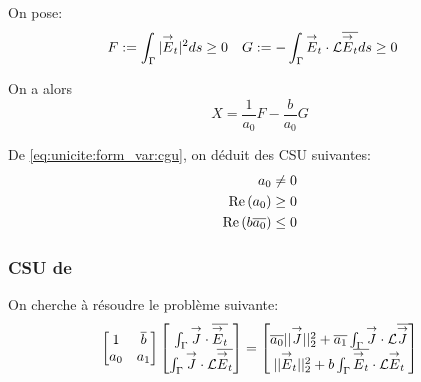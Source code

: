         On pose:
        \begin{align*}
          F&:= \int_\Gamma | {\overset{\rightarrow}{E}}_t | ^2 ds \ge 0 & G &:= -\int_\Gamma {\overset{\rightarrow}{E}}_t \cdot \mathcal{L}{\overline{{\overset{\rightarrow}{E}}_t}} ds \ge 0
        \end{align*}

        On a alors
        \begin{equation}
          \label{eq:unicite:form_var:decomp_cgu_ci1_a1_nul}
          X = \frac{1}{a_0}F - \frac{b}{a_0}G
        \end{equation}

        De \eqref{eq:unicite:form_var:cgu}, on déduit des CSU suivantes:
        \begin{align}
          a_0 \not= 0\\
          \operatorname{Re}\left(a_0\right) \ge 0\\
          \operatorname{Re}\left(b{\overline{a_0}}\right) \le 0
        \end{align}

    \subsubsection{CSU de \cite{stupfel_implementation_2015}}

      On cherche à résoudre le problème suivante:
      \[
        \begin{bmatrix}
          1 & {\overline{b}} \\
          a_0 & a_1
        \end{bmatrix}
        \begin{bmatrix}
          \int_\Gamma {\overset{\rightarrow}{J}} \cdot {\overline{{\overset{\rightarrow}{E}}_t}} \\
          \int_\Gamma {\overset{\rightarrow}{J}}\cdot \mathcal{L}{\overline{{\overset{\rightarrow}{E}}_t}}
        \end{bmatrix}
        =
        \begin{bmatrix}
          {\overline{a_0}}||{\overset{\rightarrow}{J}}||_2^2 + {\overline{a_1}}\int_\Gamma {\overset{\rightarrow}{J}} \cdot \mathcal{L}{\overline{{\overset{\rightarrow}{J}}}} \\
          ||{\overset{\rightarrow}{E}}_t||_2^2 + b\int_\Gamma {\overline{{\overset{\rightarrow}{E}}_t}} \cdot \mathcal{L}{\overset{\rightarrow}{E}}_t
        \end{bmatrix}
      \]

